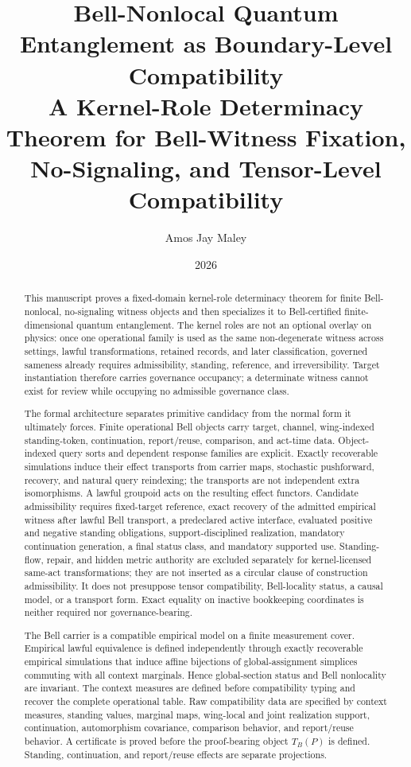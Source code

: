 \documentclass[11pt]{article}
\title{Bell-Nonlocal Quantum Entanglement as Boundary-Level Compatibility\\
\large A Kernel-Role Determinacy Theorem for Bell-Witness Fixation, No-Signaling, and Tensor-Level Compatibility}
\author{Amos Jay Maley}
\date{2026}
\theoremstyle{definition}
\begin{document}
\maketitle

\begin{abstract}
This manuscript proves a fixed-domain kernel-role determinacy theorem for finite Bell-nonlocal, no-signaling witness objects and then specializes it to Bell-certified finite-dimensional quantum entanglement. The kernel roles are not an optional overlay on physics: once one operational family is used as the same non-degenerate witness across settings, lawful transformations, retained records, and later classification, governed sameness already requires admissibility, standing, reference, and irreversibility. Target instantiation therefore carries governance occupancy; a determinate witness cannot exist for review while occupying no admissible governance class.

The formal architecture separates primitive candidacy from the normal form it ultimately forces. Finite operational Bell objects carry target, channel, wing-indexed standing-token, continuation, report/reuse, comparison, and act-time data. Object-indexed query sorts and dependent response families are explicit. Exactly recoverable simulations induce their effect transports from carrier maps, stochastic pushforward, recovery, and natural query reindexing; the transports are not independent extra isomorphisms. A lawful groupoid acts on the resulting effect functors. Candidate admissibility requires fixed-target reference, exact recovery of the admitted empirical witness after lawful Bell transport, a predeclared active interface, evaluated positive and negative standing obligations, support-disciplined realization, mandatory continuation generation, a final status class, and mandatory supported use. Standing-flow, repair, and hidden metric authority are excluded separately for kernel-licensed same-act transformations; they are not inserted as a circular clause of construction admissibility. It does not presuppose tensor compatibility, Bell-locality status, a causal model, or a transport form. Exact equality on inactive bookkeeping coordinates is neither required nor governance-bearing.

The Bell carrier is a compatible empirical model on a finite measurement cover. Empirical lawful equivalence is defined independently through exactly recoverable empirical simulations that induce affine bijections of global-assignment simplices commuting with all context marginals. Hence global-section status and Bell nonlocality are invariant. The context measures are defined before compatibility typing and recover the complete operational table. Raw compatibility data are specified by context measures, standing values, marginal maps, wing-local and joint realization support, continuation, automorphism covariance, comparison behavior, and report/reuse behavior. A certificate is proved before the proof-bearing object $T_B(P)$ is defined. Standing, continuation, and report/reuse effects are separate projections.


\end{abstract}
\end{document}
